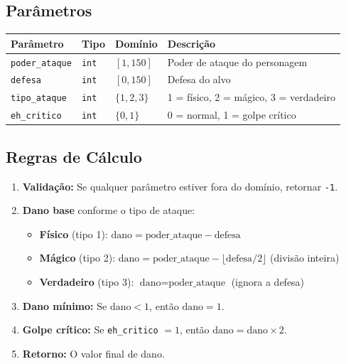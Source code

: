 \documentclass[12pt,a4paper]{article}
\begin{document}
\subsection{Parâmetros}

\begin{center}
\begin{tabular}{llll}
\toprule
\textbf{Parâmetro} & \textbf{Tipo} & \textbf{Domínio} & \textbf{Descrição} \\
\midrule
\texttt{poder\_ataque} & \texttt{int} & $[1, 150]$ & Poder de ataque do personagem \\
\texttt{defesa}        & \texttt{int} & $[0, 150]$ & Defesa do alvo \\
\texttt{tipo\_ataque}  & \texttt{int} & $\{1, 2, 3\}$ & 1 = físico, 2 = mágico, 3 = verdadeiro \\
\texttt{eh\_critico}   & \texttt{int} & $\{0, 1\}$ & 0 = normal, 1 = golpe crítico \\
\bottomrule
\end{tabular}
\end{center}

\subsection{Regras de Cálculo}

\begin{enumerate}[nosep]
  \item \textbf{Validação:} Se qualquer parâmetro estiver fora do domínio, retornar \texttt{-1}.
  \item \textbf{Dano base} conforme o tipo de ataque:
  \begin{itemize}[nosep]
    \item \textbf{Físico} (tipo 1): $\text{dano} = \text{poder\_ataque} - \text{defesa}$
    \item \textbf{Mágico} (tipo 2): $\text{dano} = \text{poder\_ataque} - \lfloor\text{defesa} / 2\rfloor$ \quad (divisão inteira)
    \item \textbf{Verdadeiro} (tipo 3): $\text{dano} = \text{poder\_ataque}$ \quad (ignora a defesa)
  \end{itemize}
  \item \textbf{Dano mínimo:} Se $\text{dano} < 1$, então $\text{dano} = 1$.
  \item \textbf{Golpe crítico:} Se \texttt{eh\_critico} $= 1$, então $\text{dano} = \text{dano} \times 2$.
  \item \textbf{Retorno:} O valor final de dano.
\end{enumerate}
\end{document}
